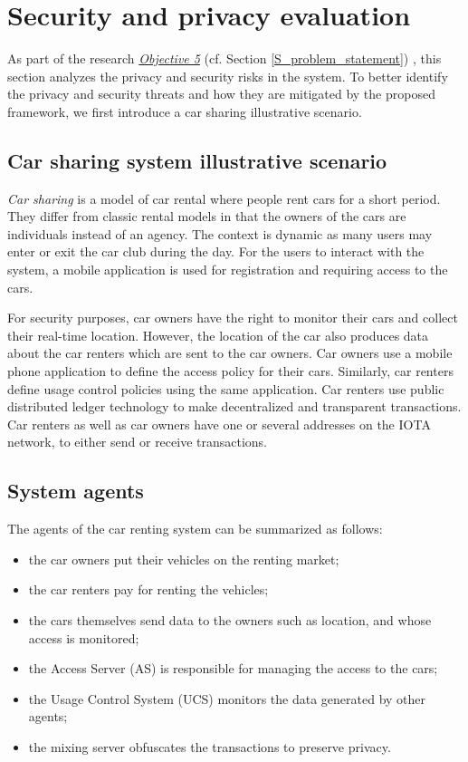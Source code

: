 \section{Security and privacy evaluation}
\label{S_security_and_privacy_evaluation}

As part of the research \hyperref[obj:56]{\emph{Objective 5}} (cf. Section \ref{S_problem_statement})
, this section analyzes the privacy and security risks in the system. To better identify the privacy and security threats and how they are mitigated by the proposed framework, we first introduce a car sharing illustrative scenario.

\subsection{Car sharing system illustrative scenario}
\label{ss_illustrative_scenario}


\emph{Car sharing} is a model of car rental where people rent cars for a short period. They differ from classic rental models in that the owners of the cars are individuals instead of an agency.
The context is dynamic as many users may enter or exit the car club during the day. For the users to interact with the system, a mobile application is used for registration and requiring access to the cars.

For security purposes, car owners have the right to monitor their cars and collect their real-time location. However, the location of the car also produces data about the car renters which are sent to the car owners. Car owners use a mobile phone application to define the access policy for their cars. Similarly, car renters define usage control policies using the same application. Car renters use public distributed ledger technology to make decentralized and transparent transactions. Car renters as well as car owners have one or several addresses on the IOTA network, to either send or receive transactions.


\subsection{System agents} The agents of the car renting system can be summarized as follows:

\begin{itemize}
    \item the car owners put their vehicles on the renting market;
    \item the car renters pay for renting the vehicles;
    \item the cars themselves send data to the owners such as location, and whose access is monitored;
    \item the Access Server (AS) is responsible for managing the access to the cars;
    \item the Usage Control System (UCS) monitors the data generated by other agents;
    \item the mixing server obfuscates the transactions to preserve privacy.
\end{itemize}

